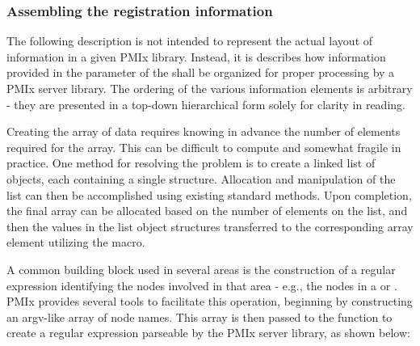 %

\subsubsection{Assembling the registration information}
\label{chap:api_server:assemble}

The following description is not intended to represent the actual layout of information in a given \ac{PMIx} library. Instead, it is describes how information provided in the  parameter of the  shall be organized for proper processing by a \ac{PMIx} server library. The ordering of the various information elements is arbitrary - they are presented in a top-down hierarchical form solely for clarity in reading.

\advicermstart
Creating the  array of data requires knowing in advance the number of elements required for the array. This can be difficult to compute and somewhat fragile in practice. One method for resolving the problem is to create a linked list of objects, each containing a single  structure. Allocation and manipulation of the list can then be accomplished using existing standard methods. Upon completion, the final  array can be allocated based on the number of elements on the list, and then the values in the list object  structures transferred to the corresponding array element utilizing the  macro.
\advicermend

\label{cptr:api_server:noderegex}A common building block used in several areas is the construction of a regular expression identifying the nodes involved in that area - e.g., the nodes in a  or . \ac{PMIx} provides several tools to facilitate this operation, beginning by constructing an argv-like array of node names. This array is then passed to the  function to create a regular expression parseable by the \ac{PMIx} server library, as shown below:

